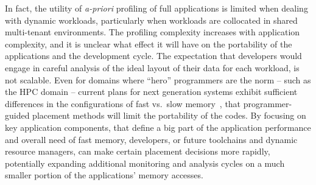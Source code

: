 In fact, the utility of {\em a-priori} profiling of full applications
is limited when dealing with dynamic workloads, particularly when workloads are collocated in shared multi-tenant environments. The profiling complexity increases with application complexity, and it is unclear what effect it will have on the portability of the applications and the development cycle. The expectation that developers would engage in careful analysis of the ideal layout of their data for each workload, is not scalable. Even for domains where ``hero'' programmers are the norm -- such as the HPC domain -- current plans for next generation systems exhibit sufficient differences in the configurations of fast vs.~slow memory~\cite{ascr:facilities}, that programmer-guided placement methods will limit the portability of the codes. 
By focusing on key application components, that define a big part of the application performance and overall need of fast memory, 
developers, or future toolchains and dynamic resource managers, can make certain placement decisions more rapidly, potentially expanding additional monitoring and analysis cycles on a much smaller portion of the applications' memory accesses. 


